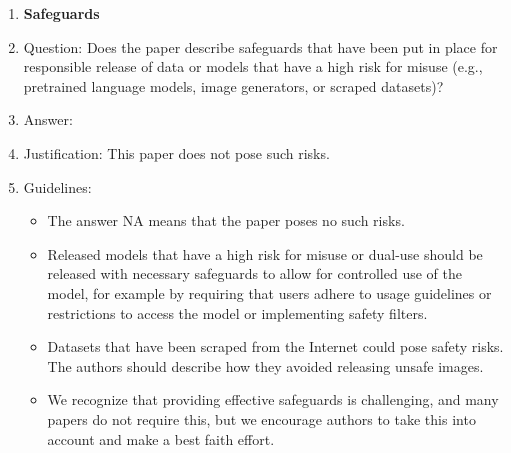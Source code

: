\documentclass{article}
\begin{document}
\begin{enumerate}
\item {\bf Safeguards}
    \item[] Question: Does the paper describe safeguards that have been put in place for responsible release of data or models that have a high risk for misuse (e.g., pretrained language models, image generators, or scraped datasets)?
    \item[] Answer: \answerNA{} %
    \item[] Justification: This paper does not pose such risks.
    \item[] Guidelines:
    \begin{itemize}
        \item The answer NA means that the paper poses no such risks.
        \item Released models that have a high risk for misuse or dual-use should be released with necessary safeguards to allow for controlled use of the model, for example by requiring that users adhere to usage guidelines or restrictions to access the model or implementing safety filters. 
        \item Datasets that have been scraped from the Internet could pose safety risks. The authors should describe how they avoided releasing unsafe images.
        \item We recognize that providing effective safeguards is challenging, and many papers do not require this, but we encourage authors to take this into account and make a best faith effort.
    \end{itemize}


\end{enumerate}
\end{document}
